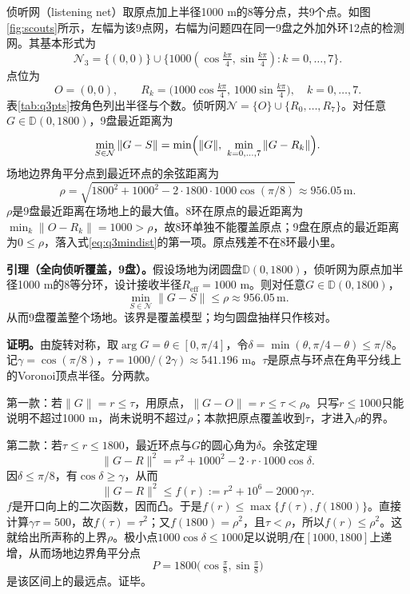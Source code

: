 \documentclass{cumcmthesis}
\begin{document}
侦听网（listening net）取原点加上半径1000 m的8等分点，共9个点。如图\ref{fig:scouts}所示，左幅为该9点网，右幅为问题四在同一9盘之外加外环12点的检测网。其基本形式为
\[
\mathcal{N}_3=\bigl\{(0,0)\bigr\}\cup\bigl\{1000(\cos\tfrac{k\pi}{4},\sin\tfrac{k\pi}{4}):k=0,\ldots,7\bigr\}.
\]
点位为
\begin{equation}
O=(0,0),\qquad
R_k=\bigl(1000\cos\tfrac{k\pi}{4},\,1000\sin\tfrac{k\pi}{4}\bigr),\quad k=0,\ldots,7.
\label{eq:q3net}
\end{equation}
表\ref{tab:q3pts}按角色列出半径与个数。侦听网$\mathcal{N}=\{O\}\cup\{R_0,\ldots,R_7\}$。对任意$G\in\mathbb{D}(0,1800)$，9盘最近距离为
\begin{equation}
\min_{S\in\mathcal{N}}\|G-S\|=\min\Bigl(\|G\|,\ \min_{k=0,\ldots,7}\|G-R_k\|\Bigr).
\label{eq:q3mindist}
\end{equation}
场地边界角平分点到最近环点的余弦距离为
\begin{equation}
\rho=\sqrt{1800^2+1000^2-2\cdot 1800\cdot 1000\cos(\pi/8)}\approx 956.05\,\mathrm{m}.
\label{eq:q3rho}
\end{equation}
$\rho$是9盘最近距离在场地上的最大值。8环在原点的最近距离为$\min_k\|O-R_k\|=1000>\rho$，故8环单独不能覆盖原点；9盘在原点的最近距离为$0\le\rho$，落入式\eqref{eq:q3mindist}的第一项。原点残差不在8环最小里。

\textbf{引理（全向侦听覆盖，9盘）。}假设场地为闭圆盘$\mathbb{D}(0,1800)$，侦听网为原点加半径1000 m的8等分环，设计接收半径$R_{\mathrm{eff}}=1000$ m。则对任意$G\in\mathbb{D}(0,1800)$，
\[
\min_{S\in\mathcal{N}}\|G-S\|\le\rho\approx 956.05\,\mathrm{m}.
\]
从而9盘覆盖整个场地。该界是覆盖模型；均匀圆盘抽样只作核对。

\textbf{证明。}由旋转对称，取$\arg G=\theta\in[0,\pi/4]$，令$\delta=\min(\theta,\pi/4-\theta)\le\pi/8$。记$\gamma=\cos(\pi/8)$，$\tau=1000/(2\gamma)\approx 541.196$ m。$\tau$是原点与环点在角平分线上的Voronoi顶点半径。分两款。

第一款：若$\|G\|=r\le \tau$，用原点，$\|G-O\|=r\le \tau<\rho$。只写$r\le 1000$只能说明不超过1000 m，尚未说明不超过$\rho$；本款把原点覆盖收到$\tau$，才进入$\rho$的界。

第二款：若$\tau\le r\le 1800$，最近环点与$G$的圆心角为$\delta$。余弦定理
\begin{equation}
\|G-R\|^2=r^2+1000^2-2\cdot r\cdot 1000\cos\delta.
\label{eq:q3cos}
\end{equation}
因$\delta\le\pi/8$，有$\cos\delta\ge \gamma$，从而
\[
\|G-R\|^2\le f(r):=r^2+10^6-2000\,\gamma r.
\]
$f$是开口向上的二次函数，因而凸。于是$f(r)\le\max\{f(\tau),f(1800)\}$。直接计算$\gamma\tau=500$，故$f(\tau)=\tau^2$；又$f(1800)=\rho^2$，且$\tau<\rho$，所以$f(r)\le\rho^2$。这就给出所声称的上界$\rho$。极小点$1000\cos\delta\le 1000$足以说明$f$在$[1000,1800]$上递增，从而场地边界角平分点
\[
P=1800\bigl(\cos\tfrac{\pi}{8},\sin\tfrac{\pi}{8}\bigr)
\]
是该区间上的最远点。证毕。
\end{document}
